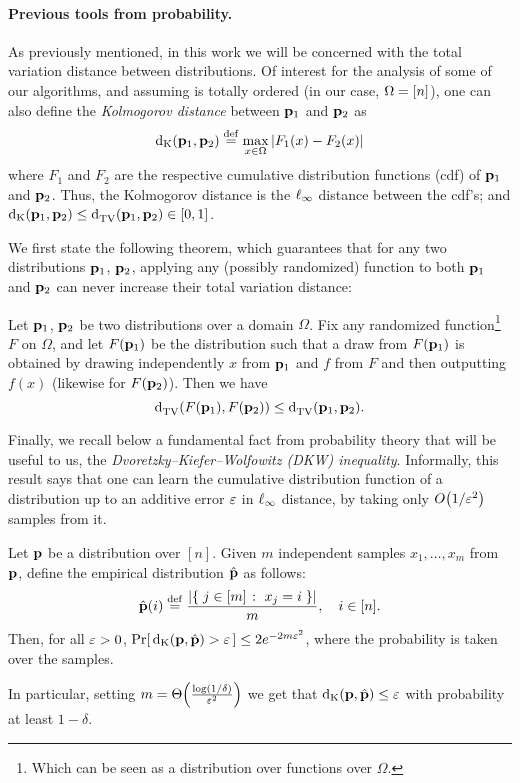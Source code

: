 \paragraph{Previous tools from probability.}
As previously mentioned, in this work we will be concerned with the total variation distance between distributions. Of interest for the analysis of some of our algorithms, and assuming \domain is totally ordered (in our case, $\domain=[n]$), one can also define the \emph{Kolmogorov distance} between $\D_1$ and $\D_2$ as
\begin{equation}\label{eq:def:dk}
  \kolmogorov{\D_1}{\D_2} \eqdef \max_{x\in \domain}\abs{F_1(x)-F_2(x)}
\end{equation}
where $F_1$ and $F_2$ are the respective cumulative distribution functions (cdf) of $\D_1$ and $\D_2$. Thus, the Kolmogorov distance is the $\lp[\infty]$ distance between the cdf's; and $\kolmogorov{\D_1}{\D_2} \leq \totalvardist{\D_1}{\D_2} \in [0,1]$. \smallskip

We first state the following theorem, which guarantees that for any two distributions $\D_1$, $\D_2$, applying any (possibly randomized) function to both $\D_1$ and $\D_2$ can never increase their total variation distance:
\begin{fact}\label{lemma:data:processing:inequality:total:variation}
Let $\D_1$, $\D_2$ be two distributions over a domain $\Omega$. Fix any randomized function\footnote{Which can be seen as a distribution over functions over $\Omega$.}{} $F$ on $\Omega$, and let $F(\D_1)$ be the distribution such that a draw from $F(\D_1)$ is obtained by drawing independently $x$ from $\D_1$ and $f$ from $F$ and then outputting $f(x)$ (likewise for $F(\D_2)$).
Then we have
\[
\totalvardist{ F(\D_1) }{  F(\D_2) }  \leq \totalvardist{ \D_1 }{ \D_2 }.
\]
\end{fact}

Finally, we recall below a fundamental fact from probability theory that will be useful to us, the \emph{Dvoretzky--Kiefer--Wolfowitz (DKW) inequality}. Informally, this result says that one can learn the cumulative distribution function of a distribution up to an additive error $\eps$ in $\lp[\infty]$ distance, by taking only $\bigO{1/\eps^2}$ samples from it.
\begin{theorem}\label{theo:dkw}
Let $\D$ be a distribution over $[n]$. Given $m$ independent samples $x_1,\dots ,x_m$ from $\D$, define the empirical distribution $\hat{\D}$ as follows:
\[
\hat{\D}(i) \eqdef \frac{\abs{ \setOfSuchThat{j\in[m]}{x_j=i} } }{m}, \quad i\in[n].
\]
Then, for all $\eps > 0$, $\probaOf{ \kolmogorov{\D}{\hat{\D}} > \eps } \leq 2e^{-2m\eps^2}$, where the probability is taken over the samples.
\end{theorem} 
\noindent In particular, setting $m=\bigTheta{\frac{\log(1/\delta)}{\eps^2}}$ we get that $\kolmogorov{\D}{\hat{\D}} \leq \eps$ with probability at least $1-\delta$.

